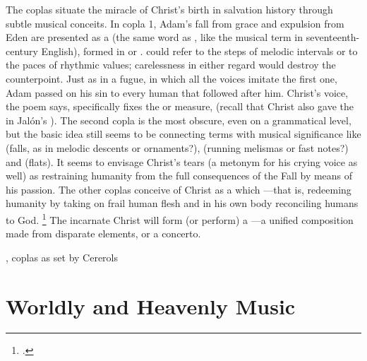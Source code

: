 
The coplas situate the miracle of Christ's birth in salvation history through
subtle musical conceits.
In copla 1, Adam's fall from grace and expulsion from Eden are presented as a
 (the same word as , like the musical term
 in seventeenth-century English), formed in 
or . 
 could refer to the steps of melodic intervals or to the paces
of rhythmic values; carelessness in either regard would destroy the
counterpoint.
Just as in a fugue, in which all the voices imitate the first one, Adam passed
on his sin to every human that followed after him.
Christ's voice, the poem says, specifically fixes the  or measure,
 (recall that Christ also gave the
 in Jalón's ).
The second copla is the most obscure, even on a grammatical level, but the basic
idea still seems to be connecting terms with musical significance like
 (falls, as in melodic descents or ornaments?), 
(running melismas or fast notes?) and  (flats).
It seems to envisage Christ's tears (a metonym for his crying voice as well) as
restraining humanity from the full consequences of the Fall by means of his
passion.
The other coplas conceive of Christ as a  which
---that is, redeeming
humanity by taking on frail human flesh and in his own body reconciling humans
to God.%
    \footnote{.}
The incarnate Christ will form (or perform) a ---a unified
composition made from disparate elements, or a concerto.


\begin{poemexample}
    \caption{, coplas as set by Cererols}
    \label{poem:Suspended_cielos-coplas}
\end{poemexample}

\section{Worldly and Heavenly Music}


